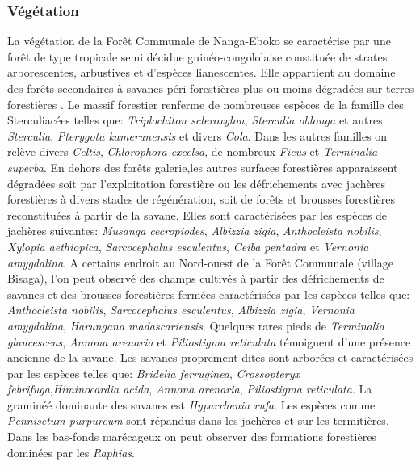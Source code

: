 \documentclass[
  12pt,
  a4paper,
  extrafontsizes,
  onecolumn,
  openright]{book}
\theoremstyle{definition}
\theoremstyle{definition}
\theoremstyle{definition}
\theoremstyle{definition}
\theoremstyle{remark}
\begin{document}
\hypertarget{vuxe9guxe9tation}{%
\subsubsection{Végétation}\label{vuxe9guxe9tation}}

La végétation de la Forêt Communale de Nanga-Eboko se caractérise par une forêt de type tropicale semi décidue guinéo-congololaise \citep{Letouzey1985} constituée de strates arborescentes, arbustives et d'espèces lianescentes. Elle appartient au domaine des forêts secondaires à savanes péri-forestières plus ou moins dégradées sur terres forestières \citep{Onana2019}. Le massif forestier renferme de nombreuses espèces de la famille des Sterculiacées telles que: \emph{Triplochiton scleroxylon}, \emph{Sterculia oblonga} et autres \emph{Sterculia}, \emph{Pterygota kamerunensis} et divers \emph{Cola}. Dans les autres familles on relève divers \emph{Celtis}, \emph{Chlorophora excelsa}, de nombreux \emph{Ficus} et \emph{Terminalia superba}. En dehors des forêts galerie,les autres surfaces forestières apparaissent dégradées soit par l'exploitation forestière ou les défrichements avec jachères forestières à divers stades de régénération, soit de forêts et brousses forestières reconstituées à partir de la savane. Elles sont caractérisées par les espèces de jachères suivantes: \emph{Musanga cecropiodes}, \emph{Albizzia zigia}, \emph{Anthocleista nobilis}, \emph{Xylopia aethiopica}, \emph{Sarcocephalus esculentus}, \emph{Ceiba pentadra} et \emph{Vernonia amygdalina}. A certains endroit au Nord-ouest de la Forêt Communale (village Bisaga), l'on peut observé des champs cultivés à partir des défrichements de savanes et des brousses forestières fermées caractérisées par les espèces telles que: \emph{Anthocleista nobilis}, \emph{Sarcocephalus esculentus}, \emph{Albizzia zigia}, \emph{Vernonia amygdalina}, \emph{Harungana madascariensis}. Quelques rares pieds de \emph{Terminalia glaucescens}, \emph{Annona arenaria} et \emph{Piliostigma reticulata} témoignent d'une présence ancienne de la savane. Les savanes proprement dites sont arborées et caractérisées par les espèces telles que: \emph{Bridelia ferruginea}, \emph{Crossopteryx febrifuga},\emph{Himinocardia acida}, \emph{Annona arenaria}, \emph{Piliostigma reticulata}. La graminéé dominante des savanes est \emph{Hyparrhenia rufa}. Les espèces comme \emph{Pennisetum purpureum} sont répandus dans les jachères et sur les termitières. Dans les bas-fonds marécageux on peut observer des formations forestières dominées par les \emph{Raphias}.
\end{document}

